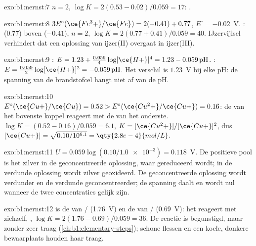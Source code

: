 \begin{solution}{exo:b1:nernst:7}
$n = 2$, $\log K = 2(0.53 - 0.02)/0.059 = 17$: .
\end{solution}

\begin{solution}{exo:b1:nernst:8}
$3E^\circ(\ce{Fe^3+}/\ce{Fe}) = 2(-0.41) + 0.77$, $E^\circ = -0.02$~V.
:   (0.77) boven 
 ($-0.41$), $n = 2$, $\log K = 2(0.77 + 0.41)/0.059 = 40$.
IJzervijlsel verhindert dat een oplossing van ijzer(II) overgaat in
ijzer(III).
\end{solution}

\begin{solution}{exo:b1:nernst:9}
: $E = 1.23 + \frac{0.059}{4}\log [\ce{H+}]^4 =
1.23 - 0.059\,\mathrm{pH}$. : $E = \frac{0.059}{2}\log
[\ce{H+}]^2 = -0.059\,\mathrm{pH}$. Het verschil is $1.23$~V bij elke
pH: de spanning van de brandstofcel hangt niet af van de pH.
\end{solution}

\begin{solution}{exo:b1:nernst:10}
$E^\circ(\ce{Cu+}/\ce{Cu}) = 0.52 > E^\circ(\ce{Cu^2+}/\ce{Cu+}) = 0.16$: de
  van het bovenste koppel reageert met de 
 van het onderste. $\log K = (0.52 - 0.16)/0.059 = 6.1$, $K =
[\ce{Cu^2+}]/[\ce{Cu+}]^2$, dus $[\ce{Cu+}] = \sqrt{0.10/10^{6.1}} =
\qty{2.8e-4}{mol/L}$.
\end{solution}

\begin{solution}{exo:b1:nernst:11}
$U = 0.059\log(0.10/\num{1.0e-3}) = 0.118$~V. De positieve pool is het
zilver in de geconcentreerde oplossing, waar  gereduceerd wordt;
in de verdunde oplossing wordt zilver geoxideerd. De geconcentreerde
oplossing wordt verdunder en de verdunde geconcentreerder; de spanning
daalt en wordt nul wanneer de twee concentraties gelijk zijn.
\end{solution}

\begin{solution}{exo:b1:nernst:12}
 is de  van / (1.76~V) en de 
van / (0.69~V): het reageert met zichzelf,
, $\log K = 2(1.76 - 0.69)/0.059 = 36$. De reactie
is begunstigd, maar zonder  zeer traag
(\cref{ch:b1:elementary-steps}); schone flessen en een koele, donkere
bewaarplaats houden haar traag.
\end{solution}

